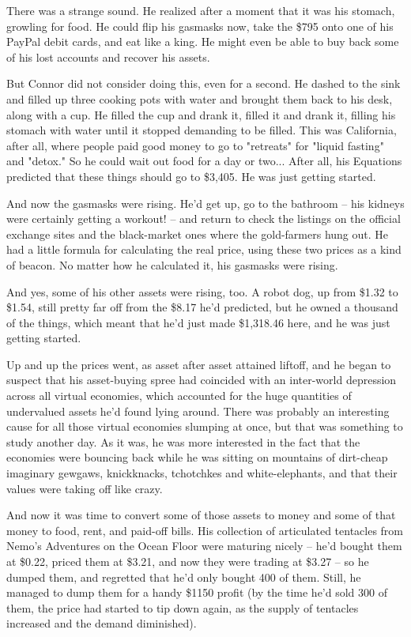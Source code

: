 There was a strange sound. He realized after a moment that it was
his stomach, growling for food. He could flip his gasmasks now,
take the \$795 onto one of his PayPal debit cards, and eat like a
king. He might even be able to buy back some of his lost accounts
and recover his assets.

But Connor did not consider doing this, even for a second. He
dashed to the sink and filled up three cooking pots with water and
brought them back to his desk, along with a cup. He filled the cup
and drank it, filled it and drank it, filling his stomach with
water until it stopped demanding to be filled. This was California,
after all, where people paid good money to go to "retreats" for
"liquid fasting" and "detox." So he could wait out food for a day
or two... After all, his Equations predicted that these things
should go to \$3,405. He was just getting started.

And now the gasmasks were rising. He'd get up, go to the bathroom
-- his kidneys were certainly getting a workout! -- and return to
check the listings on the official exchange sites and the
black-market ones where the gold-farmers hung out. He had a little
formula for calculating the real price, using these two prices as a
kind of beacon. No matter how he calculated it, his gasmasks were
rising.

And yes, some of his other assets were rising, too. A robot dog, up
from \$1.32 to \$1.54, still pretty far off from the \$8.17 he'd
predicted, but he owned a thousand of the things, which meant that
he'd just made \$1,318.46 here, and he was just getting started.

Up and up the prices went, as asset after asset attained liftoff,
and he began to suspect that his asset-buying spree had coincided
with an inter-world depression across all virtual economies, which
accounted for the huge quantities of undervalued assets he'd found
lying around. There was probably an interesting cause for all those
virtual economies slumping at once, but that was something to study
another day. As it was, he was more interested in the fact that the
economies were bouncing back while he was sitting on mountains of
dirt-cheap imaginary gewgaws, knickknacks, tchotchkes and
white-elephants, and that their values were taking off like crazy.

And now it was time to convert some of those assets to money and
some of that money to food, rent, and paid-off bills. His
collection of articulated tentacles from Nemo's Adventures on the
Ocean Floor were maturing nicely -- he'd bought them at \$0.22,
priced them at \$3.21, and now they were trading at \$3.27 -- so he
dumped them, and regretted that he'd only bought 400 of them.
Still, he managed to dump them for a handy \$1150 profit (by the
time he'd sold 300 of them, the price had started to tip down
again, as the supply of tentacles increased and the demand
diminished).

